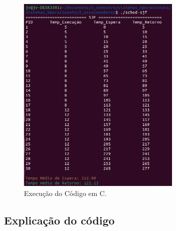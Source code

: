 \documentclass[
	12pt,				%
	openright,			%
	oneside,			%
	a4paper,			%
	chapter=TITLE,		%
	english,			%
	french,				%
	spanish,			%
	brazil				%
	]{abntex2}
\theoremstyle{definition}
\begin{document}
\begin{figure}[H]
    \centering
    \includegraphics[width=0.7\textwidth]{imagens/sjf_run.png}
    \caption{Execução do Código em C.}
    \label{fig:sjf_run}
\end{figure}

\subsection{Explicação do código}
\end{document}

